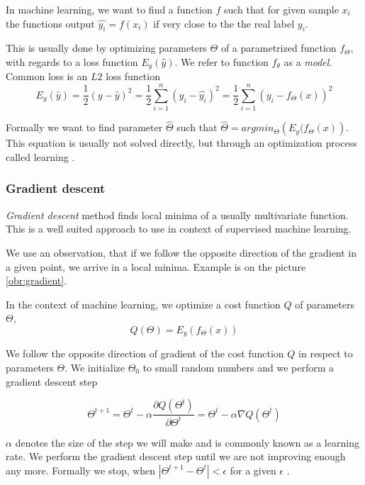     \* %
    
    In machine learning, we want to find a function $f$ such that for given sample $x_i$
    the functions output $\hat{y_i} = f(x_i)$ if very close to the the real label $y_i$.
    
    This is usually done by optimizing parameters $\Theta$ of a parametrized function $f_\Theta$,
    with regards to a loss function $E_y(\hat{y})$. 
    We refer to function $f_\theta$ as a \textit{model}.
    Common loss is an $L2$ loss function 
    $$E_y(\hat{y}) = \frac{1}{2}(y - \hat{y})^2 = \frac{1}{2}\sum_{i=1}^n (y_i - \hat{y_i})^2= \frac{1}{2}\sum_{i=1}^n (y_i - f_\Theta(x))^2$$  
    
    Formally we want to find parameter $\hat{\Theta}$ such that $\hat{\Theta} = argmin_\Theta \left(E_y(f_\Theta(x) \right)$. 
    This equation is usually not solved directly, but through an optimization process called learning \cite{Goodfellow-et-al-2016}. %
    
    \subsubsection{Gradient descent}

    \textit{Gradient descent} method finds local minima of a usually multivariate function. 
    This is a well suited approach to use in context of supervised machine learning. 
    
    We use an observation, that if we follow the opposite direction of the gradient in a given point, 
    we arrive in a local minima. Example is on the picture \ref{obr:gradient}.
    
    In the context of machine learning, we optimize a cost function $Q$ of parameters $\Theta$, 
    $$Q(\Theta) = E_y(f_\Theta(x))$$
    
    We follow the opposite direction of gradient of the cost function $Q$ in respect to parameters $\Theta$. 
    We initialize $\Theta_0$ to small random numbers and we perform a gradient descent step
    
    $$\Theta^{t+1} = \Theta^t - \alpha \frac{\partial Q(\Theta^t)}{\partial \Theta^t} = \Theta^t - \alpha \nabla Q(\Theta^t)$$
    
    $\alpha$ denotes the size of the step we will make and is commonly known as a learning rate. 
    We perform the gradient descent step until we are not improving enough any more. 
    Formally we stop, when $|\Theta^{t+1} - \Theta^t| < \epsilon$ for a given $\epsilon$ \cite{bottou-bousquet-2008}.
    
